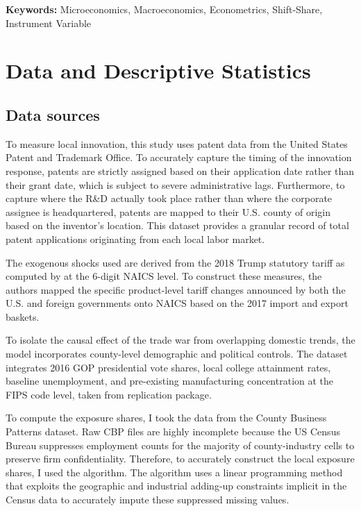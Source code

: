 \documentclass[12pt]{article}
\numberwithin{figure}{section}
\numberwithin{table}{section}
\begin{document}
\textbf{Keywords:} Microeconomics, Macroeconomics, Econometrics, Shift-Share, Instrument Variable






\newpage




\newpage
\section{Data and Descriptive Statistics}
\subsection{Data sources}

To measure local innovation, this study uses patent data from the United States Patent and Trademark Office. To accurately capture the timing of the innovation response, patents are strictly assigned based on their application date rather than their grant date, which is subject to severe administrative lags. Furthermore, to capture where the R\&D actually took place rather than where the corporate assignee is headquartered, patents are mapped to their U.S. county of origin based on the inventor's location. This dataset provides a granular record of total patent applications originating from each local labor market.

The exogenous shocks used are derived from the 2018 Trump statutory tariff as computed by \cite{Fajgelbaum2020} at the 6-digit NAICS level. To construct these measures, the authors mapped the specific product-level tariff changes announced by both the U.S. and foreign governments onto NAICS based on the 2017 import and export baskets.

To isolate the causal effect of the trade war from overlapping domestic trends, the model incorporates county-level demographic and political controls. The dataset integrates 2016 GOP presidential vote shares, local college attainment rates, baseline unemployment, and pre-existing manufacturing concentration at the FIPS code level, taken from \cite{Fajgelbaum2020} replication package.

To compute the exposure shares, I took the data from the County Business Patterns dataset. Raw CBP files are highly incomplete because the US Census Bureau suppresses employment counts for the majority of county-industry cells to preserve firm confidentiality. Therefore, to accurately construct the local exposure shares, I used the \cite{Eckert2020} algorithm. The algorithm uses a linear programming method that exploits the geographic and industrial adding-up constraints implicit in the Census data to accurately impute these suppressed missing values.
\end{document}
